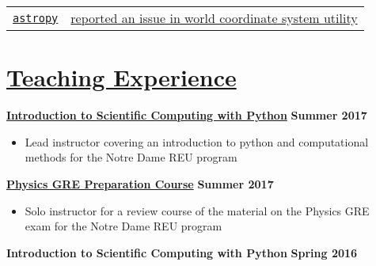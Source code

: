 \documentclass[margin]{res}
\begin{document}
\begin{resume}
\begin{tabular}{l p{4.9in}}
\href{http://www.astropy.org}{\texttt{astropy}} & \href{https://github.com/astropy/astropy/issues/4976}{reported an issue in world coordinate system utility} 

\end{tabular}








\section{\href{https://www3.nd.edu/~brose3/\#classes}{Teaching Experience}}\label{teaching}
\textbf{\href{https://www3.nd.edu/~brose3/2017reu-cmp}{Introduction to Scientific Computing with Python}} \hfill{} \textbf{Summer 2017}
\begin{itemize}\itemsep -2pt
    \item[] Lead instructor covering an introduction to python and computational \\methods for the Notre Dame REU program
    \end{itemize} \vspace{-12pt}
\textbf{\href{https://www3.nd.edu/~brose3/2017reu-gre}{Physics GRE Preparation Course}} \hfill{} \textbf{Summer 2017}
\begin{itemize}\itemsep -2pt
    \item[] Solo instructor for a review course of the material on the Physics GRE \\exam for the Notre Dame REU program
    \end{itemize} \vspace{-12pt}
\textbf{Introduction to Scientific Computing with Python} \hfill{} \textbf{Spring 2016}

\end{resume}
\end{document}
